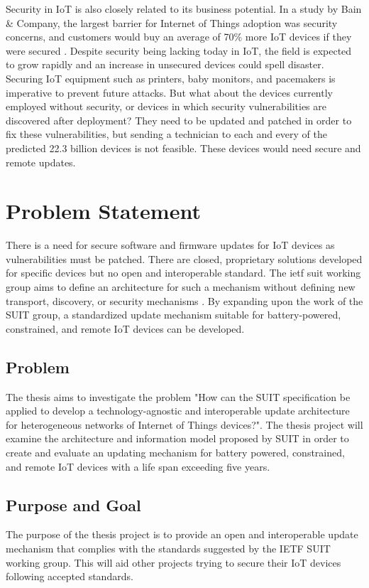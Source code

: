 \documentclass[0-thesis.tex]{subfiles}
\begin{document}
Security in IoT is also closely related to its business potential. In a study by Bain \&
Company, the largest barrier for Internet of Things adoption was security concerns, and
customers would buy an average of 70\% more IoT devices if they were secured
\parencite{ali_bosche_ford_2018}. Despite security being lacking today in IoT, the field
is expected to grow rapidly and an increase in unsecured devices could spell disaster.
Securing IoT equipment such as printers, baby monitors, and pacemakers is imperative to
prevent future attacks. But what about the devices currently employed without security, or
devices in which security vulnerabilities are discovered after deployment? They need to be
updated and patched in order to fix these vulnerabilities, but sending a technician to
each and every of the predicted 22.3 billion devices is not feasible. These devices would
need secure and remote updates.

\section{Problem Statement}
\label{sec:problem-statement}
There is a need for secure software and firmware updates for IoT devices as
vulnerabilities must be patched. There are closed, proprietary solutions developed for
specific devices but no open and interoperable standard. The \gls{ietf} \gls{suit} working
group aims to define an architecture for such a mechanism without defining new transport,
discovery, or security mechanisms \parencite{suit}. By expanding upon the work of the SUIT
group, a standardized update mechanism suitable for battery-powered, constrained, and
remote IoT devices can be developed.

\subsection{Problem}
\label{ssec:problem}
The thesis aims to investigate the problem "How can the SUIT specification be applied to
develop a technology-agnostic and interoperable update architecture for heterogeneous
networks of Internet of Things devices?". The thesis project will examine the architecture
and information model proposed by SUIT in order to create and evaluate an updating
mechanism for battery powered, constrained, and remote IoT devices with a life span
exceeding five years.

\subsection{Purpose and Goal}
\label{ssec:purpose-goal}
The purpose of the thesis project is to provide an open and interoperable update mechanism
that complies with the standards suggested by the IETF SUIT working group. This will aid
other projects trying to secure their IoT devices following accepted standards.
\end{document}
